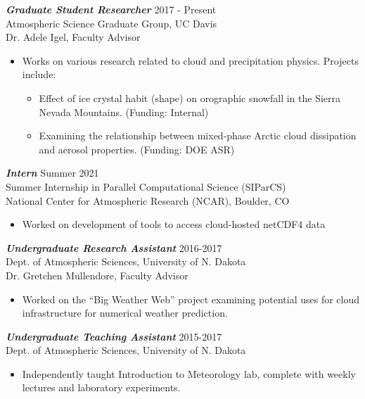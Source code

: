 \documentclass[overlapped]{res}
\begin{document}
\begin{resume}
                {\sl \textbf{Graduate Student Researcher}} \hfill 2017 - Present \\
                Atmospheric Science Graduate Group, UC Davis \\
                Dr. Adele Igel, Faculty Advisor \\
                \begin{itemize}
                    \item Works on various research related to cloud and precipitation physics. Projects include:
                    \begin{itemize} \itemsep -2pt
                        \item Effect of ice crystal habit (shape) on orographic snowfall in the Sierra Nevada Mountains. (Funding: Internal)
                        \item Examining the relationship between mixed-phase Arctic cloud dissipation and aerosol properties. (Funding: DOE ASR) 
                    \end{itemize}
                \end{itemize}

                {\sl \textbf{Intern}} \hfill Summer 2021 \\
                Summer Internship in Parallel Computational Science (SIParCS) \\
                National Center for Atmospheric Research (NCAR), Boulder, CO
                \begin{itemize}
                    \item Worked on development of tools to access cloud-hosted netCDF4 data 
                \end{itemize}

                {\sl \textbf{Undergraduate Research Assistant}} \hfill 2016-2017 \\
                Dept. of Atmospheric Sciences, University of N. Dakota \\
                Dr. Gretchen Mullendore, Faculty Advisor \\
                \begin{itemize}\itemsep -2pt
                    \item Worked on the “Big Weather Web” project examining potential uses for cloud infrastructure for numerical weather prediction.
                \end{itemize}

                {\sl \textbf{Undergraduate Teaching Assistant}} \hfill 2015-2017 \\
                Dept. of Atmospheric Sciences, University of N. Dakota \\
                \begin{itemize}\itemsep -2pt
                    \item Independently taught Introduction to Meteorology lab, complete with weekly lectures and laboratory experiments.
                    

\end{itemize}
\end{resume}
\end{document}
